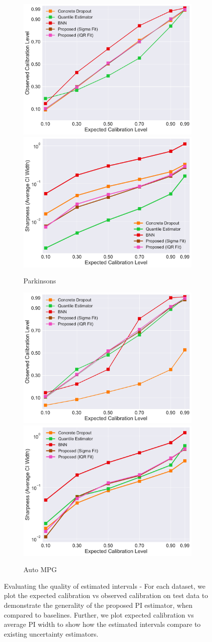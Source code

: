 \documentclass[letterpaper]{article} %
\begin{document}
\begin{figure}[t]
    \vfill

    \begin{subfigure}[b]{0.48\textwidth}
	        \centering
			\includegraphics[width=0.48\linewidth, keepaspectratio=true]{parkinsons.pdf}
			\includegraphics[width=0.48\linewidth, keepaspectratio=true]{parkinsons-cvsws.pdf}
		\caption{Parkinsons}
	    \label{fig:parkinsons}
    \end{subfigure}
    \begin{subfigure}[b]{0.48\textwidth}
	        \centering
			\includegraphics[width=0.48\linewidth, keepaspectratio=true]{autompg.pdf}
			\includegraphics[width=0.48\linewidth, keepaspectratio=true]{autompg-cvsws.pdf}
		\caption{Auto MPG}
	    \label{fig:autompg}
    \end{subfigure}
	\caption{Evaluating the quality of estimated intervals - For each dataset, we plot the expected calibration vs observed calibration on test data to demonstrate the generality of the proposed PI estimator, when compared to baselines. Further, we plot expected calibration vs average PI width to show how the estimated intervals compare to existing uncertainty estimators.}
	\label{fig:regression}
\end{figure}
\end{document}
